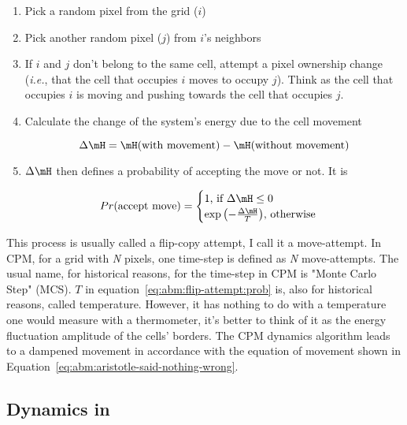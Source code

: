 \begin{enumerate}
    \item Pick a random pixel from the grid ($i$)
    \item Pick another random pixel ($j$) from $i$'s neighbors
    \item If $i$ and $j$ don't belong to the same cell, attempt a pixel ownership change (\textit{i.e.}, that the cell that occupies $i$ moves to occupy $j$). Think as the cell that occupies $i$ is moving and pushing towards the cell that occupies $j$. 
    \item Calculate the change of the system's energy due to the cell movement
    
    \begin{equation}\label{eq:abm:flip-attempt:delta}
        \Delta \mH = \mH(\text{with movement}) - \mH(\text{without movement})
    \end{equation}
    
    \item $\Delta \mH$ then defines a probability of accepting the move or not. It is
    
    \begin{equation}\label{eq:abm:flip-attempt:prob}
        Pr(\text{accept move}) = \begin{cases}
        1\text{, if } \Delta \mH \leq 0\\
        \exp{\left(-\frac{\Delta \mH}{T}\right)}\text{, otherwise}
        \end{cases}
    \end{equation}
\end{enumerate}

This process is usually called a flip-copy attempt, I call it a move-attempt. In CPM, for a grid with \textit{N} pixels, one time-step is defined as \textit{N} move-attempts. The usual name, for historical reasons, for the time-step in CPM is "Monte Carlo Step" (MCS). $T$ in equation~\ref{eq:abm:flip-attempt:prob} is, also for historical reasons, called temperature. However, it has nothing to do with a temperature one would measure with a thermometer, it's better to think of it as the energy fluctuation amplitude of the cells' borders. %
The CPM dynamics algorithm leads to a dampened movement in accordance with the equation of movement shown in Equation~\ref{eq:abm:aristotle-said-nothing-wrong}. 

\subsection{Dynamics in \psc}\label{sec:abm:center}

